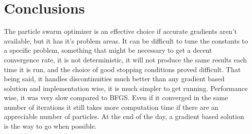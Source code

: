 \documentclass[12pt,parskip=full]{article}
\numberwithin{subsection}{section}
\begin{document}
	\section{Conclusions}
		
		The particle swarm optimizer is an effective choice if accurate gradients aren't available, but it has it's problem
		areas. It can be difficult to tune the constants to a specific problem, something that might be necessary to
		get a decent convergence rate, it is not deterministic, it will not produce the same results each time it is
		run, and the choice of good stopping conditions proved difficult. That being said, it handles discontinuities 
		much better than any gradient based solution and implementation wise, it is much simpler to get running.
		Performance wise, it was very slow compared to BFGS. Even if it converged in the same number of iterations it 
		still takes more computation time if there are an appreciable number of particles. At the end of the day, a
		gradient based solution is the way to go when possible.
	
				
\end{document}
